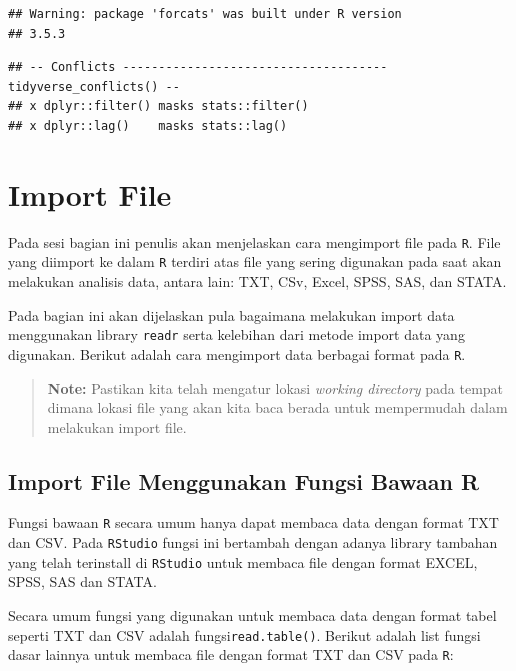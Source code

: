 \documentclass[]{book}
\begin{document}
\begin{verbatim}
## Warning: package 'forcats' was built under R version
## 3.5.3
\end{verbatim}

\begin{verbatim}
## -- Conflicts ------------------------------------- tidyverse_conflicts() --
## x dplyr::filter() masks stats::filter()
## x dplyr::lag()    masks stats::lag()
\end{verbatim}

\section{Import File}\label{import-file}

Pada sesi bagian ini penulis akan menjelaskan cara mengimport file pada
\texttt{R}. File yang diimport ke dalam \texttt{R} terdiri atas file
yang sering digunakan pada saat akan melakukan analisis data, antara
lain: TXT, CSv, Excel, SPSS, SAS, dan STATA.

Pada bagian ini akan dijelaskan pula bagaimana melakukan import data
menggunakan library \texttt{readr} serta kelebihan dari metode import
data yang digunakan. Berikut adalah cara mengimport data berbagai format
pada \texttt{R}.

\begin{quote}
\textbf{Note: } Pastikan kita telah mengatur lokasi \emph{working
directory} pada tempat dimana lokasi file yang akan kita baca berada
untuk mempermudah dalam melakukan import file.
\end{quote}

\subsection{Import File Menggunakan Fungsi Bawaan
R}\label{import-file-menggunakan-fungsi-bawaan-r}

Fungsi bawaan \texttt{R} secara umum hanya dapat membaca data dengan
format TXT dan CSV. Pada \texttt{RStudio} fungsi ini bertambah dengan
adanya library tambahan yang telah terinstall di \texttt{RStudio} untuk
membaca file dengan format EXCEL, SPSS, SAS dan STATA.

Secara umum fungsi yang digunakan untuk membaca data dengan format tabel
seperti TXT dan CSV adalah fungsi\texttt{read.table()}. Berikut adalah
list fungsi dasar lainnya untuk membaca file dengan format TXT dan CSV
pada \texttt{R}:
\end{document}

